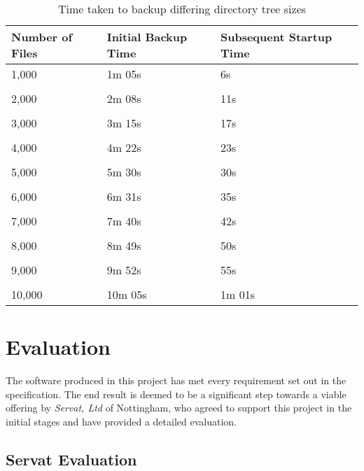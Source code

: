 \begin{table}[H]
    \centering
    \begin{tabular}{ l l l }
        Number of Files & Initial Backup Time   & Subsequent Startup Time
        \\ \toprule
        1,000           & 1m 05s                & 6s
        \\ \\
        2,000           & 2m 08s                & 11s
        \\ \\
        3,000           & 3m 15s                & 17s
        \\ \\
        4,000           & 4m 22s                & 23s
        \\ \\
        5,000           & 5m 30s                & 30s
        \\ \\
        6,000           & 6m 31s                & 35s
        \\ \\
        7,000           & 7m 40s                & 42s
        \\ \\
        8,000           & 8m 49s                & 50s
        \\ \\
        9,000           & 9m 52s                & 55s
        \\ \\
        10,000          & 10m 05s               & 1m 01s
        \\ \bottomrule
    \end{tabular}
    \caption{Time taken to backup differing directory tree sizes}
    \label{tab:performance}
\end{table}

\section{Evaluation}

The software produced in this project has met every requirement set out in the
specification. The end result is deemed to be a significant step towards
a viable offering by \emph{Servat, Ltd} of Nottingham, who agreed to support
this project in the initial stages and have provided a detailed evaluation.

\subsection{Servat Evaluation}

